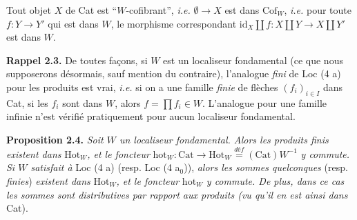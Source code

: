 \begin{description}[leftmargin=7.5em, labelwidth=6.5em]
\item[Loc (4 a$_0$)] Tout objet $X$ de Cat est “$W$-cofibrant”, \textit{i.e.} $\emptyset \longrightarrow X$ est dans $\mathrm{Cof}_W$, \textit{i.e.} pour toute $f : Y \longrightarrow Y'$ qui est dans $W$, le morphisme correspondant $\mathrm{id}_X \amalg f : X \amalg Y \longrightarrow X \amalg Y'$ est dans $W$.
\end{description}

\textbf{Rappel 2.3.} De toutes façons, si $W$ est un localiseur fondamental (ce que nous supposerons désormais, sauf mention du contraire), l'analogue \textit{fini} de Loc (4 a) pour les produits est vrai, \textit{i.e.} si on a une famille \textit{finie} de flèches $(f_i)_{i\in I}$ dans Cat, si les $f_i$ sont dans $W$, alors $f = \prod f_i \in W$. L'analogue pour une famille infinie n'est vérifié pratiquement pour aucun localiseur fondamental.

\textbf{Proposition 2.4.} \textit{Soit $W$ un localiseur fondamental. Alors les produits finis existent dans} $\mathrm{Hot}_W$\textit{, et le foncteur} $\mathrm{hot}_W : \mathrm{Cat} \longrightarrow \mathrm{Hot}_W \overset{\textit{déf}}{=} (\mathrm{Cat})W^{-1}$ \textit{y commute. Si $W$ satisfait à} Loc (4 a) (resp. Loc (4 a$_0$)), \textit{alors les sommes quelconques} (resp. \textit{finies}) \textit{existent dans} $\mathrm{Hot}_W$\textit{, et le foncteur} $\mathrm{hot}_W$ \textit{y commute. De plus, dans ce cas les sommes sont distributives par rapport aux produits (vu qu'il en est ainsi dans} Cat).


